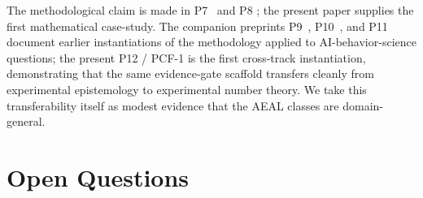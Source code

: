 \documentclass[12pt]{amsart}
\theoremstyle{definition}
\begin{document}
The methodological claim is made in P7~\cite{P7AIBehSci} and P8
\cite{P8AEAL}; the present paper supplies the first mathematical
case-study. The companion preprints P9~\cite{P9}, P10~\cite{P10}, and
P11~\cite{P11} document earlier instantiations of the methodology
applied to AI-behavior-science questions; the present P12 / PCF-1 is
the first cross-track instantiation, demonstrating that the same
evidence-gate scaffold transfers cleanly from experimental epistemology
to experimental number theory. We take this transferability itself as
modest evidence that the AEAL classes are domain-general.

\section{Open Questions}\label{sec:open}
\end{document}
